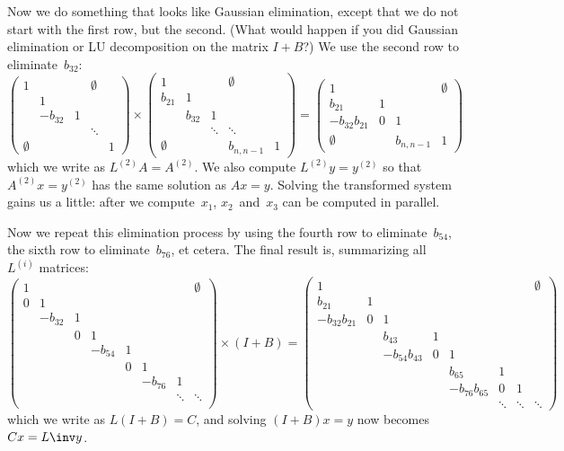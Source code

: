 Now we do something that looks like Gaussian elimination, except that
we do not start with the first row, but the second. (What would happen
if you did Gaussian elimination or LU decomposition on the matrix
$I+B$?) We use the second row to eliminate~$b_{32}$:
\[
  \begin{pmatrix}
    1&&&\emptyset\\ &1\\ &-b_{32}&1\\ &&&\ddots\\
    \emptyset&&&&1
  \end{pmatrix}\times
  \begin{pmatrix}
    1&&&\emptyset\\ b_{21}&1\\ &b_{32}&1\\ &&\ddots&\ddots\\ 
    \emptyset&&&b_{n,n-1}&1
  \end{pmatrix}
  =
  \begin{pmatrix}
    1&&&\emptyset\\ b_{21}&1\\ -b_{32}b_{21}&0&1\\ 
    \emptyset&&b_{n,n-1}&1
  \end{pmatrix}
\]
which we write as $L^{(2)}A=A^{(2)}$. We also compute
$L^{(2)}y=y^{(2)}$ so that $A^{(2)}x=y^{(2)}$ has the same solution as
$Ax=y$. Solving the transformed system gains us a little: after we
compute~$x_1$, $x_2$~and~$x_3$ can be computed in parallel.

Now we repeat this elimination process by using the fourth row to
eliminate~$b_{54}$, the sixth row to eliminate~$b_{76}$, et
cetera. The final result is, summarizing all~$L^{(i)}$ matrices:
{\small
\[
  \begin{pmatrix}
    1&&&&&&&\emptyset\\ 0&1\\ &-b_{32}&1\\ &&0&1\\
    &&&-b_{54}&1\\ &&&&0&1\\ &&&&&-b_{76}&1\\ &&&&&&\ddots&\ddots\\
  \end{pmatrix}\times (I+B) =
  \begin{pmatrix}
    1&&&&&&&\emptyset\\ b_{21}&1\\ -b_{32}b_{21}&0&1\\ 
    &&b_{43}&1\\ &&-b_{54}b_{43}&0&1\\
    &&&&b_{65}&1\\ &&&&-b_{76}b_{65}&0&1\\ &&&&&\ddots&\ddots&\ddots
  \end{pmatrix}
\]
}
which we write as $L(I+B)=C$, and solving $(I+B)x=y$ now becomes
$Cx=L\inv y$.

